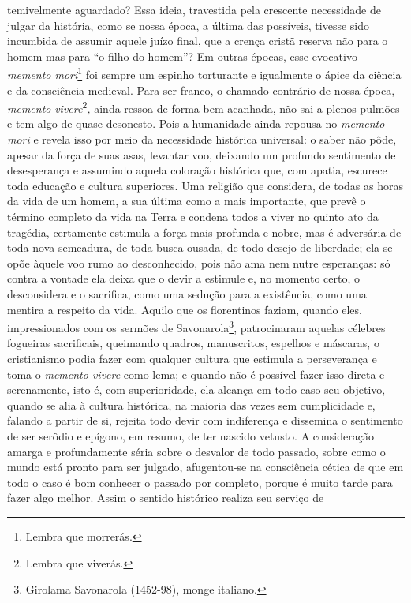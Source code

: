 temivelmente aguardado? Essa ideia, travestida pela crescente
necessidade de julgar da história, como se nossa época, a última das
possíveis, tivesse sido incumbida de assumir aquele juízo final, que a
crença cristã reserva não para o homem mas para ``o filho do homem''? Em
outras épocas, esse evocativo \emph{memento mori}\footnote{Lembra que
  morrerás.} foi sempre um espinho torturante e igualmente o ápice da
ciência e da consciência medieval. Para ser franco, o chamado contrário
de nossa época, \emph{memento} \emph{vivere}\footnote{Lembra que
  viverás.}\emph{,} ainda ressoa de forma bem acanhada, não sai a plenos
pulmões e tem algo de quase desonesto. Pois a humanidade ainda repousa
no \emph{memento mori} e revela isso por meio da necessidade histórica
universal: o saber não pôde, apesar da força de suas asas, levantar voo,
deixando um profundo sentimento de desesperança e assumindo aquela
coloração histórica que, com apatia, escurece toda educação e cultura
superiores. Uma religião que considera, de todas as horas da vida de um
homem, a sua última como a mais importante, que prevê o término completo
da vida na Terra e condena todos a viver no quinto ato da tragédia,
certamente estimula a força mais profunda e nobre, mas é adversária de
toda nova semeadura, de toda busca ousada, de todo desejo de liberdade;
ela se opõe àquele voo rumo ao desconhecido, pois não ama nem nutre
esperanças: só contra a vontade ela deixa que o devir a estimule e, no
momento certo, o desconsidera e o sacrifica, como uma sedução para a
existência, como uma mentira a respeito da vida. Aquilo que os
florentinos faziam, quando eles, impressionados com os sermões de
Savonarola\footnote{Girolama Savonarola (1452-98), monge italiano.},
patrocinaram aquelas célebres fogueiras sacrificais, queimando quadros,
manuscritos, espelhos e máscaras, o cristianismo podia fazer com
qualquer cultura que estimula a perseverança e toma o \emph{memento
vivere} como lema; e quando não é possível fazer isso direta e
serenamente, isto é, com superioridade, ela alcança em todo caso seu
objetivo, quando se alia à cultura histórica, na maioria das vezes sem
cumplicidade e, falando a partir de si, rejeita todo devir com
indiferença e dissemina o sentimento de ser serôdio e epígono, em
resumo, de ter nascido vetusto. A consideração amarga e profundamente
séria sobre o desvalor de todo passado, sobre como o mundo está pronto
para ser julgado, afugentou-se na consciência cética de que em todo o
caso é bom conhecer o passado por completo, porque é muito tarde para
fazer algo melhor. Assim o sentido histórico realiza seu serviço de
